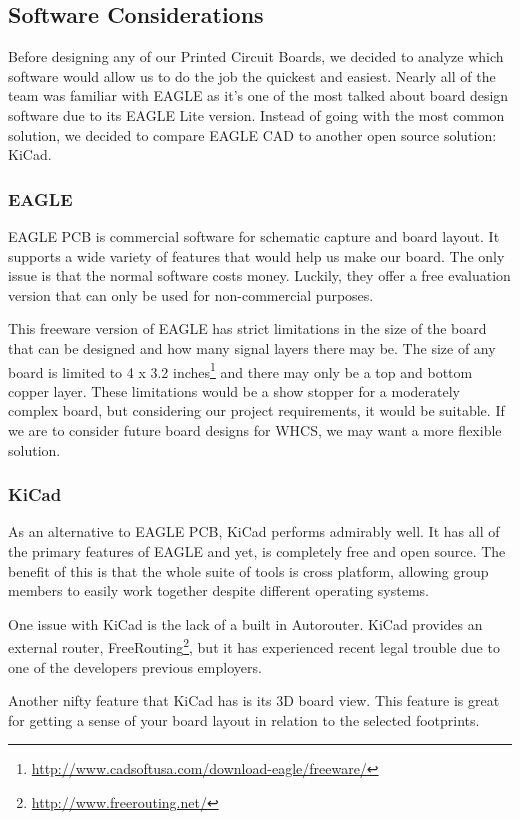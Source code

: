 
\subsection{Software Considerations}
Before designing any of our Printed Circuit Boards, we decided to analyze which
software would allow us to do the job the quickest and easiest. Nearly all of
the team was familiar with EAGLE as it's one of the most talked about board
design software due to its EAGLE Lite version. Instead of going with the most
common solution, we decided to compare EAGLE CAD to another open source
solution: KiCad.

\subsubsection{EAGLE}
EAGLE PCB is commercial software for schematic capture and board layout. It
supports a wide variety of features that would help us make our board. The only
issue is that the normal software costs money. Luckily, they offer a free
evaluation version that can only be used for non-commercial purposes.

This freeware version of EAGLE has strict limitations in the size of the board
that can be designed and how many signal layers there may be. The size of any
board is limited to 4 x 3.2
inches\footnote{\url{http://www.cadsoftusa.com/download-eagle/freeware/}} and
there may only be a top and bottom copper layer. These limitations would be a
show stopper for a moderately complex board, but considering our project
requirements, it would be suitable.  If we are to consider future board designs
for WHCS, we may want a more flexible solution.

\subsubsection{KiCad}
As an alternative to EAGLE PCB, KiCad performs admirably well. It has all of
the primary features of EAGLE and yet, is completely free and open source. The benefit of this is that the whole suite of tools is cross platform, allowing group members to easily work together despite different operating systems.

One issue with KiCad is the lack of a built in Autorouter. KiCad provides an external router, FreeRouting\footnote{\url{http://www.freerouting.net/}}, but it has experienced recent legal trouble due to one of the developers previous employers.

Another nifty feature that KiCad has is its 3D board view. This feature is great for getting a sense of your board layout in relation to the selected footprints.
